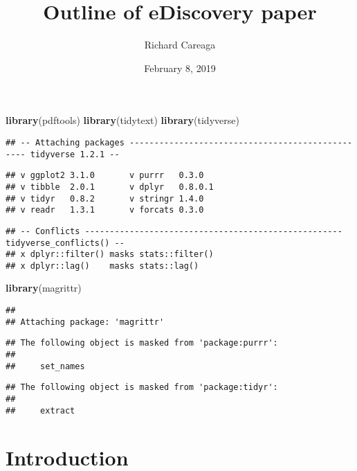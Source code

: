 \documentclass[]{article}
\title{Outline of eDiscovery paper}
\author{Richard Careaga}
\date{February 8, 2019}
\newenvironment{Shaded}{\begin{snugshade}}{\end{snugshade}}
\newcommand{\KeywordTok}[1]{\textcolor[rgb]{0.13,0.29,0.53}{\textbf{#1}}}
\newcommand{\NormalTok}[1]{#1}
\begin{document}
\maketitle

\begin{Shaded}
\begin{Highlighting}[]
\KeywordTok{library}\NormalTok{(pdftools)}
\KeywordTok{library}\NormalTok{(tidytext)}
\KeywordTok{library}\NormalTok{(tidyverse)}
\end{Highlighting}
\end{Shaded}

\begin{verbatim}
## -- Attaching packages ------------------------------------------------- tidyverse 1.2.1 --
\end{verbatim}

\begin{verbatim}
## v ggplot2 3.1.0       v purrr   0.3.0  
## v tibble  2.0.1       v dplyr   0.8.0.1
## v tidyr   0.8.2       v stringr 1.4.0  
## v readr   1.3.1       v forcats 0.3.0
\end{verbatim}

\begin{verbatim}
## -- Conflicts ---------------------------------------------------- tidyverse_conflicts() --
## x dplyr::filter() masks stats::filter()
## x dplyr::lag()    masks stats::lag()
\end{verbatim}

\begin{Shaded}
\begin{Highlighting}[]
\KeywordTok{library}\NormalTok{(magrittr)}
\end{Highlighting}
\end{Shaded}

\begin{verbatim}
## 
## Attaching package: 'magrittr'
\end{verbatim}

\begin{verbatim}
## The following object is masked from 'package:purrr':
## 
##     set_names
\end{verbatim}

\begin{verbatim}
## The following object is masked from 'package:tidyr':
## 
##     extract
\end{verbatim}

\hypertarget{introduction}{%
\section{Introduction}\label{introduction}}
\end{document}
